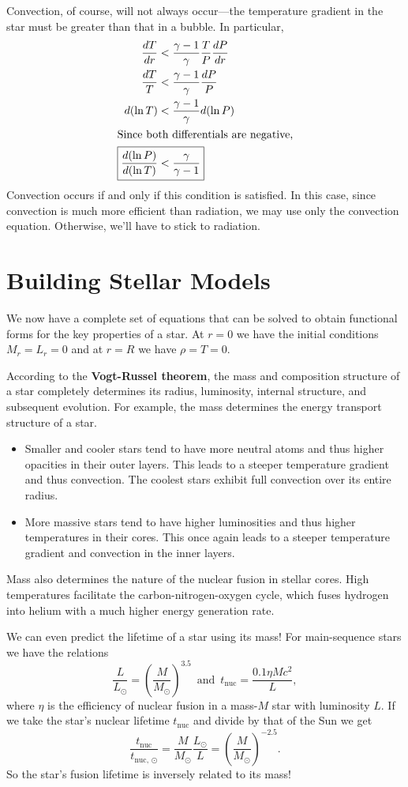 \documentclass[../a062main.tex]{subfiles}
\begin{document}
Convection, of course, will not always occur---the temperature gradient in the star must be greater than that in a bubble.
In particular,
\begin{align*}
    \frac{dT}{dr} &< \frac{\gamma - 1}{\gamma} \frac{T}{P} \frac{dP}{dr} \\
    \frac{dT}{T} &< \frac{\gamma - 1}{\gamma} \frac{dP}{P} \\
    d(\ln T) &< \frac{\gamma - 1}{\gamma} d(\ln P) \\
    \intertext{Since both differentials are negative,}
    \Aboxed{\frac{d(\ln P)}{d(\ln T)} &< \frac{\gamma}{\gamma - 1}}
\end{align*}
Convection occurs if and only if this condition is satisfied.
In this case, since convection is much more efficient than radiation, we may use only the convection equation.
Otherwise, we'll have to stick to radiation.

\section{Building Stellar Models}
We now have a complete set of equations that can be solved to obtain functional forms for the key properties of a star.
At $r=0$ we have the initial conditions $M_r = L_r = 0$ and at $r = R$ we have $\rho = T = 0$.

According to the \textbf{Vogt-Russel theorem}, the mass and composition structure of a star completely determines its radius, luminosity, internal structure, and subsequent evolution.
For example, the mass determines the energy transport structure of a star.
\begin{itemize}
    \item Smaller and cooler stars tend to have more neutral atoms and thus higher opacities in their outer layers.
    This leads to a steeper temperature gradient and thus convection.
    The coolest stars exhibit full convection over its entire radius.

    \item More massive stars tend to have higher luminosities and thus higher temperatures in their cores.
    This once again leads to a steeper temperature gradient and convection in the inner layers.
\end{itemize}
Mass also determines the nature of the nuclear fusion in stellar cores.
High temperatures facilitate the carbon-nitrogen-oxygen cycle, which fuses hydrogen into helium with a much higher energy generation rate.

We can even predict the lifetime of a star using its mass!
For main-sequence stars we have the relations
\[ \frac{L}{L_\odot} = \left( \frac{M}{M_\odot} \right)^{3.5} \,\text{ and }\, t_\textrm{nuc} = \frac{0.1 \eta M c^2}{L}, \]
where $\eta$ is the efficiency of nuclear fusion in a mass-$M$ star with luminosity $L$.
If we take the star's nuclear lifetime $t_\textrm{nuc}$ and divide by that of the Sun we get
\[ \frac{t_\textrm{nuc}}{t_{\textrm{nuc, }\odot}} = \frac{M}{M_\odot} \frac{L_\odot}{L} = \left( \frac{M}{M_\odot} \right)^{-2.5}. \]
So the star's fusion lifetime is inversely related to its mass!
\end{document}
